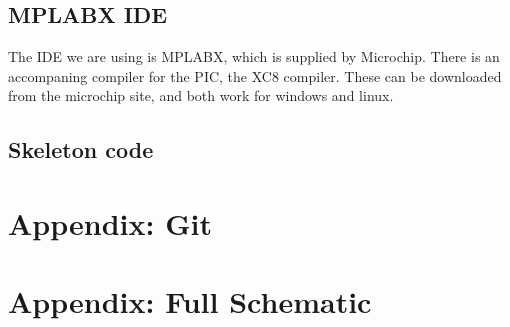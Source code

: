 \documentclass{article}
\begin{document}
\subsection{MPLABX IDE}
The IDE we are using is MPLABX, which is supplied by Microchip. There is an accompaning compiler for the PIC, the XC8 compiler. These can be downloaded from the microchip site, and both work for windows and linux.

\subsection{Skeleton code}


\section{Appendix: Git}
\section{Appendix: Full Schematic}
\end{document}
